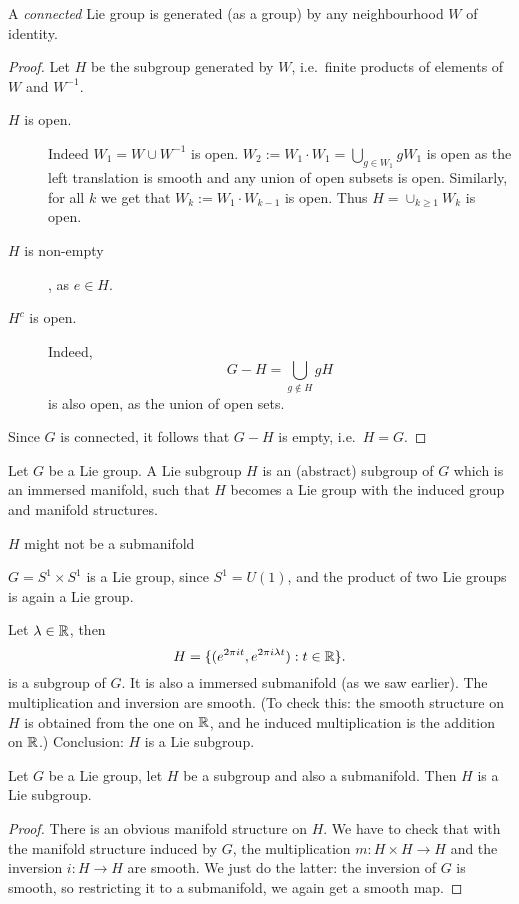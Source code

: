 \begin{prop}
    A \emph{connected} Lie group is generated (as a group) by any neighbourhood $W$ of identity. 
\end{prop}

\begin{proof}
    Let $H$ be the subgroup generated by $W$, i.e.\ finite products of elements of $W$ and $W^{-1}$.
   
    \begin{description}
        \item[$H$ is open.] Indeed $W_1 = W \cup  W^{-1}$ is open. 
        $W_2 := W_1 \cdot W_1 = \bigcup_{g \in W_1} g W_1$ is open as the left translation is smooth and any union of open subsets is open. Similarly, for all $k$ we get that  $W_k := W_1 \cdot W_{k-1} $ is open. Thus $H=\cup_{k\ge 1} W_k$ is open.

    \item[$H$ is non-empty], as $e \in H$.

    \item[$H^{c}$ is open.] Indeed,
         \[
        G - H = \bigcup_{g \not\in H}  gH
        \] 
     is also open, as the union of open sets.
    \end{description}
    Since $G$ is connected, it follows that $G -H$ is empty, i.e.\ $H=G$.
\end{proof}

\begin{definition}
    Let $G$ be a Lie group.
    A Lie subgroup $H$ is an (abstract) subgroup of $G$ which is an immersed manifold, such that $H$  becomes a Lie group with the induced group and manifold structures.
\end{definition}
\begin{remark}
    $H$ might not be a submanifold
\end{remark}
\begin{eg}
    $G = S^1 \times S^1$ is a Lie group, since $S^{1} = U(1)$, and the product of two Lie groups is again a Lie group.
  
    Let $\lambda \in \mathbb{R}$, then
    \[
        H = \{ (e^{ 2 \pi i t}, e^{2 \pi i \lambda t}) : t \in \mathbb{R} \}
    .\] 
    is a subgroup of $G$.
    It is also a immersed submanifold (as we saw earlier).
    The multiplication and inversion are smooth.
    (To check this: the   smooth structure on $H$ is obtained from the one on $\mathbb{R}$, and  he induced multiplication is the addition on $\mathbb{R}$.)
 Conclusion: $H$ is a Lie subgroup.  \end{eg}
\begin{prop}
    Let $G$ be a Lie group, let $H$ be a subgroup and also a submanifold.
    Then $H$ is a Lie subgroup.
\end{prop}
\begin{proof}
    There is an obvious manifold structure on $H$.
We have to check that with the manifold structure induced by $G$, the multiplication $m : H \times  H \to  H$   and the inversion $i: H \to  H$ are smooth. We just do the latter: the inversion of $G$ is smooth, so restricting it to a submanifold, we again get a smooth map.
\end{proof}


